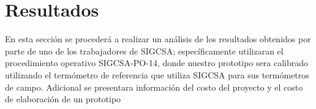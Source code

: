 \chapter{Resultados}

\par 
En esta sección se procederá a realizar un análisis de los resultados obtenidos por parte de uno de los trabajadores de SIGCSA; específicamente utilizaran el procedimiento operativo SIGCSA-PO-14, donde nuestro prototipo sera calibrado utilizando el termómetro de referencia que utiliza SIGCSA para sus termómetros de campo. Adicional se presentara información del costo del proyecto y el costo de elaboración de un prototipo

